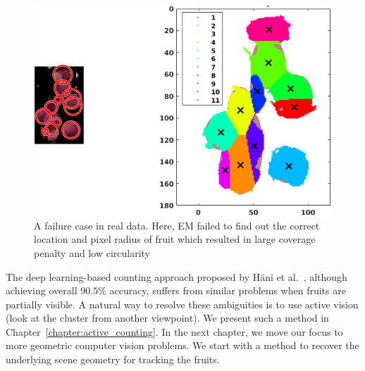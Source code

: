 \begin{figure}[!htbp]
    \centering
            \centering
            \includegraphics[width = .8\textwidth]{figures/counting/emfail3.png}
       
        \caption[A failure case for the unsupervised clustering based counting on real data.]{A failure case in real data. Here, EM failed to find out the correct location and pixel radius of fruit which resulted in large coverage penalty and low circularity}
   \label{fig:grpfail}

\end{figure}

The deep learning-based counting approach proposed by  H{\"a}ni et al.~\cite{hani_jfr_counting}, although achieving overall $90.5\%$ accuracy, suffers from similar problems when fruits are partially visible. A natural way to resolve these ambiguities is to use active vision (look at the cluster from another viewpoint). We present such a method in Chapter~\ref{chapter:active_counting}. In the next chapter, we move our focus to more geometric computer vision problems. We start with a method to recover the underlying scene geometry for tracking the fruits.